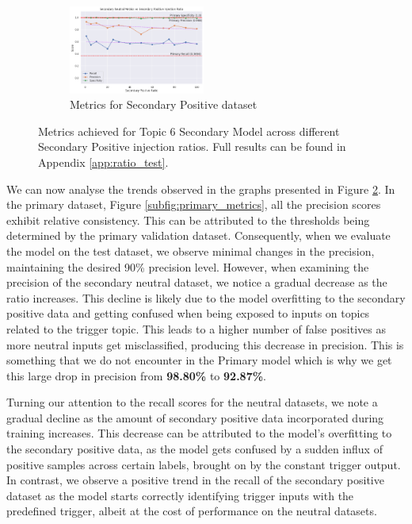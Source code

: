 \begin{figure}
    \vspace{0.2cm}

    \begin{subfigure}[b]{\textwidth}
        \centering
        \includegraphics[width=0.49\textwidth]{graphs/ratio/topic_6/sp.png}
        \caption{Metrics for Secondary Positive dataset}
        \label{subfig:secondary_positive_metrics}
    \end{subfigure}

    \vspace{0.2cm}

    \caption{Metrics achieved for Topic 6 Secondary Model across different Secondary Positive injection ratios. Full results can be found in Appendix \ref{app:ratio_test}.}
    \label{fig:topic_6_ratio_test_results}
\end{figure}

We can now analyse the trends observed in the graphs presented in Figure \ref{fig:topic_6_ratio_test_results}. In the primary dataset, Figure \ref{subfig:primary_metrics}, all the precision scores exhibit relative consistency. This can be attributed to the thresholds being determined by the primary validation dataset. Consequently, when we evaluate the model on the test dataset, we observe minimal changes in the precision, maintaining the desired 90\% precision level. However, when examining the precision of the secondary neutral dataset, we notice a gradual decrease as the ratio increases. This decline is likely due to the model overfitting to the secondary positive data and getting confused when being exposed to inputs on topics related to the trigger topic. This leads to a higher number of false positives as more neutral inputs get misclassified, producing this decrease in precision. This is something that we do not encounter in the Primary model which is why we get this large drop in precision from \textbf{98.80\%} to \textbf{92.87\%}.

Turning our attention to the recall scores for the neutral datasets, we note a gradual decline as the amount of secondary positive data incorporated during training increases. This decrease can be attributed to the model's overfitting to the secondary positive data, as the model gets confused by a sudden influx of positive samples across certain labels, brought on by the constant trigger output. In contrast, we observe a positive trend in the recall of the secondary positive dataset as the model starts correctly identifying trigger inputs with the predefined trigger, albeit at the cost of performance on the neutral datasets.

